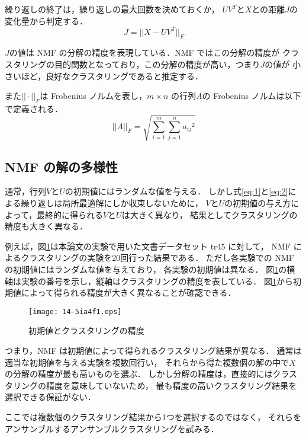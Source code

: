 \documentclass[japanese]{jnlp_1.3e}
\begin{document}
繰り返しの終了は，繰り返しの最大回数を決めておくか，
\( UV^{T} \)と\( X \)との距離\( J \)の変化量から判定する．
\begin{equation}
  \label{eq:3}
J = || X - UV^{T} ||_{F}           
\end{equation}

\( J \)の値は NMF の分解の精度を表現している．NMF ではこの分解の精度が
クラスタリングの目的関数となっており，この分解の精度が高い，つまり\( J \)の値が
小さいほど，良好なクラスタリングであると推定する．

また\( || \cdot ||_{F} \)は Frobenius ノルムを表し，\( m \times n \) の行列\( A \)の
Frobenius ノルムは以下で定義される．
\[
|| A ||_{F} = \sqrt{\sum_{i = 1}^{m} \sum_{j = 1}^{n} {a_{ij}}^2}
\]


\subsection{NMF の解の多様性}

通常，行列\( V \)と\( U \)の初期値にはランダムな値を与える．
しかし\mbox{式\ref{eq:1}と\ref{eq:2}}による繰り返しは局所最適解にしか収束しないために，
\( V \)と\( U \)の初期値の与え方によって，最終的に得られる\( V \)と\( U \)は大きく異なり，
結果としてクラスタリングの精度も大きく異なる．

例えば，\mbox{図\ref{tr45a}}は本論文の実験で用いた文書データセット tr45 に対して，
NMF によるクラスタリングの実験を20回行った結果である．
ただし各実験での NMF の初期値にはランダムな値を与えており，
各実験の初期値は異なる．
\mbox{図\ref{tr45a}}の横軸は実験の番号を示し，縦軸はクラスタリングの精度を表している．
\mbox{図\ref{tr45a}}から初期値によって得られる精度が大きく異なることが確認できる．

\begin{figure}[t]
\begin{center}
\texttt{[image: 14-5ia4f1.eps]}
\caption{初期値とクラスタリングの精度}\label{tr45a}
\end{center}
\end{figure}

つまり，NMF は初期値によって得られるクラスタリング結果が異なる．
通常は適当な初期値を与える実験を複数回行い，
それらから得た複数個の解の中で\( X \)の分解の精度が最も高いものを選ぶ．
しかし分解の精度は，直接的にはクラスタリングの精度を意味していないため，
最も精度の高いクラスタリング結果を選択できる保証がない．

ここでは複数個のクラスタリング結果から1つを選択するのではなく，
それらをアンサンブルするアンサンブルクラスタリングを試みる．
\end{document}
